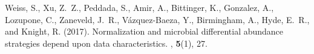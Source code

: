 \documentclass[11pt]{article}
\begin{document}
\begin{thebibliography}{}
Weiss, S., Xu, Z.~Z., Peddada, S., Amir, A., Bittinger, K., Gonzalez, A.,
  Lozupone, C., Zaneveld, J.~R., V{\'a}zquez-Baeza, Y., Birmingham, A., Hyde,
  E.~R., and Knight, R. (2017).
\newblock Normalization and microbial differential abundance strategies depend
  upon data characteristics.
, {\bf 5}(1), 27.

\end{thebibliography}
\end{document}
